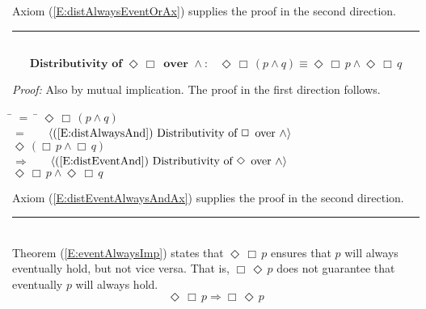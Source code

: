 \documentclass[fleqn, leqno]{article}
\newcommand{\lgap}{2pt}                             %
\newcommand{\mymathindent}{24pt}                    %
\newcommand{\impl}{\ensuremath{\Rightarrow}}        %
\newcommand{\Event}{\Diamond\,}
\newcommand{\Always}{\Box\,}
\newcommand{\myqed}{\hfill\rule[-.23ex]{1.2ex}{2.0ex}}
\newcommand{\Gll} {\langle}                         %
\newcommand{\Ggg} {\rangle}                         %
\newcommand{\Hint}[1]     {\ \ \ $\Gll              \mbox{#1} \Ggg$ }   %
\begin{document}
Axiom (\ref{E:distAlwaysEventOrAx}) supplies the proof in the second direction.
\myqed\\[\lgap]

\begin{equation}\label{E:distEventAlwaysAnd}
\textbf{Distributivity of $\Event\Always$ over $\land$:}\quad \Event\Always(p \land q) \equiv \Event\Always p \land \Event\Always q
\end{equation}

\emph{Proof:} Also by mutual implication.
The proof in the first direction follows.
\begin{tabbing}
\hspace{\mymathindent} \= $= \;$ \= \kill
  \> \>   $\Event\Always (p \land q)$\\[\lgap]
  \> $=$  \>  \Hint{(\ref{E:distAlwaysAnd}) Distributivity of $\Always$ over $\land$}\\[\lgap]
  \> \>   $\Event(\Always p \land \Always q)$\\[\lgap]
  \> $\impl$  \>  \Hint{(\ref{E:distEventAnd}) Distributivity of $\Event$ over $\land$}\\[\lgap]
  \> \>   $\Event\Always p \land \Event\Always q$\\[\lgap]
\end{tabbing}

Axiom (\ref{E:distEventAlwaysAndAx}) supplies the proof in the second direction.
\myqed\\[\lgap]

Theorem (\ref{E:eventAlwaysImp}) states that $\Event\Always p$ ensures that $p$ will always eventually hold, but not vice versa.
That is, $\Always\Event p$ does not guarantee that eventually $p$ will always hold.
\begin{equation}\label{E:eventAlwaysImp}
\Event\Always p \impl \Always\Event p
\end{equation}
\end{document}
